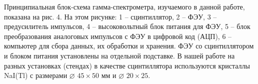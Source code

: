 
Принципиальная блок-схема гамма-спектрометра, изучаемого в данной работе,
показана на рис. 4. На этом рисунке: 1 – сцинтиллятор, 2 – ФЭУ, 3 –
предусилитель импульсов, 4 – высоковольтный блок питания для ФЭУ, 5 – блок
преобразования аналоговых импульсов с ФЭУ в цифровой код (АЦП), 6 – компьютер
для сбора данных, их обработки и хранения. ФЭУ со сцинтиллятором и блоком
питания установлены на отдельной подставке. В нашей работе на разных установках
(стендах) в качестве сцинтиллятора используются кристаллы NaI(Tl) с размерами
$\diameter $ $45 \times 50$ мм и $\diameter$ $20 \times 25$.